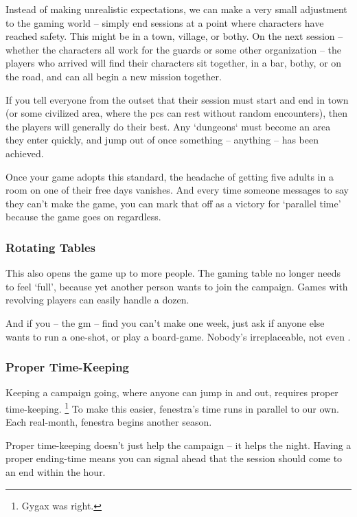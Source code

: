 \begin{multicols}{2}
Instead of making unrealistic expectations, we can make a very small adjustment to the gaming world -- simply end sessions at a point where characters have reached safety.
This might be in a town, \gls{village}, or \gls{bothy}.
On the next session -- whether the characters all work for the \glspl{guard} or some other organization -- the players who arrived will find their characters sit together, in a bar, \gls{bothy}, or on the road, and can all begin a new mission together.

If you tell everyone from the outset that their session must start and end in town (or some civilized area, where the \glspl{pc} can rest without random encounters), then the players will generally do their best.
Any `dungeons` must become an area they enter quickly, and jump out of once something -- anything -- has been achieved.

Once your game adopts this standard, the headache of getting five adults in a room on one of their free days vanishes.
And every time someone messages to say they can't make the game, you can mark that off as a victory for `parallel time' because the game goes on regardless.

\subsubsection{Rotating Tables}

This also opens the game up to more people.
The gaming table no longer needs to feel `full', because yet another person wants to join the campaign.
Games with revolving players can easily handle a dozen.

And if you -- the \gls{gm} -- find you can't make one week, just ask if anyone else wants to run a one-shot, or play a board-game.
Nobody's irreplaceable, not even .

\subsubsection{Proper Time-Keeping}

Keeping a campaign going, where anyone can jump in and out, requires proper time-keeping.%
\footnote{Gygax was right.}
To make this easier, \gls{fenestra}'s time runs in parallel to our own.
Each real-month, \gls{fenestra} begins another season.

Proper time-keeping doesn't just help the campaign -- it helps the night.
Having a proper ending-time means you can signal ahead that the session should come to an end within the hour.


\end{multicols}
